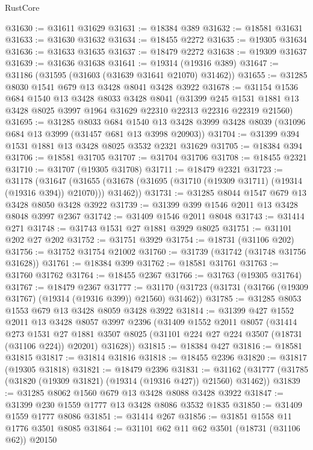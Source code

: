 \begin{lexlean}{RustCore}
\begin{coremodule}
@31630 := @31611 @31629
@31631 := @18384 @389
@31632 := @18581 @31631
@31633 := @31630 @31632
@31634 := @18455 @2272
@31635 := @19305 @31634
@31636 := @31633 @31635
@31637 := @18479 @2272
@31638 := @19309 @31637
@31639 := @31636 @31638
@31641 := @19314 (@19316 @389)
@31647 := @31186 (@31595 (@31603 (@31639 @31641 @21070) @31462))
@31655 := @31285 @8030 @1541 @679 @13 @3428 @8041 @3428 @3922
@31678 := @31154
    @1536
    @684
    @1540
    @13
    @3428
    @8033
    @3428
    @8041
    (@31399 @245 @1531 @1881 @13 @3428 @8025 @3997 @1964 @31629 @22310 @22313 @22316 @22319 @21560)
@31695 := @31285
    @8033
    @684
    @1540
    @13
    @3428
    @3999
    @3428
    @8039
    (@31096 @684 @13 @3999 (@31457 @681 @13 @3998 @20903))
@31704 := @31399 @394 @1531 @1881 @13 @3428 @8025 @3532 @2321 @31629
@31705 := @18384 @394
@31706 := @18581 @31705
@31707 := @31704 @31706
@31708 := @18455 @2321
@31710 := @31707 (@19305 @31708)
@31711 := @18479 @2321
@31723 := @31178
    (@31647
      (@31655 (@31678 (@31695 (@31710 (@19309 @31711) (@19314 (@19316 @394)) @21070))) @31462))
@31731 := @31285 @8044 @1547 @679 @13 @3428 @8050 @3428 @3922
@31739 := @31399 @399 @1546 @2011 @13 @3428 @8048 @3997 @2367
@31742 := @31409 @1546 @2011 @8048
@31743 := @31414 @271
@31748 := @31743 @1531 @27 @1881 @3929 @8025
@31751 := @31101 @202 @27 @202
@31752 := @31751 @3929
@31754 := @18731 (@31106 @202)
@31756 := @31752 @31754 @21002
@31760 := @31739 (@31742 (@31748 @31756 @31628))
@31761 := @18384 @399
@31762 := @18581 @31761
@31763 := @31760 @31762
@31764 := @18455 @2367
@31766 := @31763 (@19305 @31764)
@31767 := @18479 @2367
@31777 := @31170 (@31723 (@31731 (@31766 (@19309 @31767) (@19314 (@19316 @399)) @21560) @31462))
@31785 := @31285 @8053 @1553 @679 @13 @3428 @8059 @3428 @3922
@31814 := @31399
    @427
    @1552
    @2011
    @13
    @3428
    @8057
    @3997
    @2396
    (@31409
      @1552
      @2011
      @8057
      (@31414
        @273
        @1531
        @27
        @1881
        @3507
        @8025
        (@31101 @224 @27 @224 @3507 (@18731 (@31106 @224)) @20201)
        @31628))
@31815 := @18384 @427
@31816 := @18581 @31815
@31817 := @31814 @31816
@31818 := @18455 @2396
@31820 := @31817 (@19305 @31818)
@31821 := @18479 @2396
@31831 := @31162 (@31777 (@31785 (@31820 (@19309 @31821) (@19314 (@19316 @427)) @21560) @31462))
@31839 := @31285 @8062 @1560 @679 @13 @3428 @8088 @3428 @3922
@31847 := @31399 @230 @1559 @1777 @13 @3428 @8086 @3532 @1835
@31850 := @31409 @1559 @1777 @8086
@31851 := @31414 @267
@31856 := @31851 @1558 @11 @1776 @3501 @8085
@31864 := @31101 @62 @11 @62 @3501 (@18731 (@31106 @62)) @20150

\end{coremodule}
\end{lexlean}
